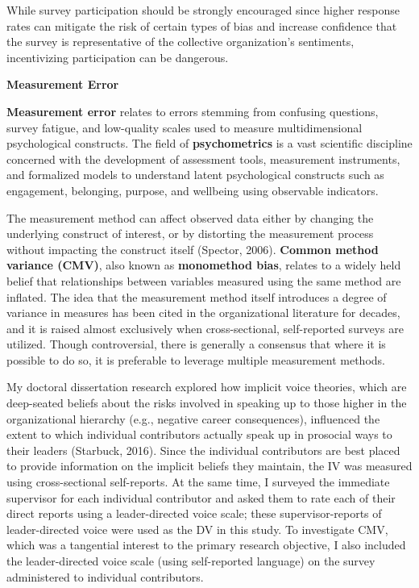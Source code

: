 \documentclass[
]{book}
\begin{document}
While survey participation should be strongly encouraged since higher response rates can mitigate the risk of certain types of bias and increase confidence that the survey is representative of the collective organization's sentiments, incentivizing participation can be dangerous.

\textbf{Measurement Error}

\textbf{Measurement error} relates to errors stemming from confusing questions, survey fatigue, and low-quality scales used to measure multidimensional psychological constructs. The field of \textbf{psychometrics} is a vast scientific discipline concerned with the development of assessment tools, measurement instruments, and formalized models to understand latent psychological constructs such as engagement, belonging, purpose, and wellbeing using observable indicators.

The measurement method can affect observed data either by changing the underlying construct of interest, or by distorting the measurement process without impacting the construct itself (Spector, 2006). \textbf{Common method variance (CMV)}, also known as \textbf{monomethod bias}, relates to a widely held belief that relationships between variables measured using the same method are inflated. The idea that the measurement method itself introduces a degree of variance in measures has been cited in the organizational literature for decades, and it is raised almost exclusively when cross-sectional, self-reported surveys are utilized. Though controversial, there is generally a consensus that where it is possible to do so, it is preferable to leverage multiple measurement methods.

My doctoral dissertation research explored how implicit voice theories, which are deep-seated beliefs about the risks involved in speaking up to those higher in the organizational hierarchy (e.g., negative career consequences), influenced the extent to which individual contributors actually speak up in prosocial ways to their leaders (Starbuck, 2016). Since the individual contributors are best placed to provide information on the implicit beliefs they maintain, the IV was measured using cross-sectional self-reports. At the same time, I surveyed the immediate supervisor for each individual contributor and asked them to rate each of their direct reports using a leader-directed voice scale; these supervisor-reports of leader-directed voice were used as the DV in this study. To investigate CMV, which was a tangential interest to the primary research objective, I also included the leader-directed voice scale (using self-reported language) on the survey administered to individual contributors.
\end{document}

